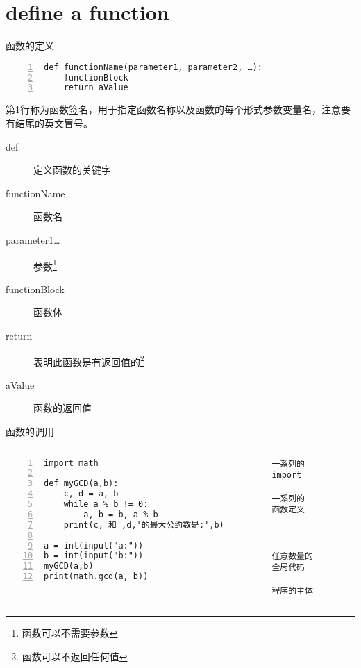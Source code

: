 \documentclass{beamer}
\begin{document}
\section{define a function}
\begin{frame}[fragile]{函数的定义}
\begin{Verbatim}[numbers=left,frame=single,rulecolor=\color{red}]
def functionName(parameter1, parameter2, …):
    functionBlock
    return aValue
\end{Verbatim}
第1行称为函数签名，用于指定函数名称以及函数的每个形式参数变量名，注意要有结尾的英文冒号。
\begin{description}
\item[ def ] 定义函数的关键字
\item[ functionName ] 函数名
\item[ parameter1…] 参数\footnote{函数可以不需要参数}
\item[ functionBlock ] 函数体
\item[ return ] 表明此函数是有返回值的\footnote{函数可以不返回任何值}
\item[ aValue ] 函数的返回值
\end{description}

\end{frame}

\begin{frame}[fragile]{函数的调用}
\begin{columns}
\begin{Verbatim}[numbers=left,frame=single,rulecolor=\color{red}]
import math

def myGCD(a,b):
    c, d = a, b
    while a % b != 0:
        a, b = b, a % b
    print(c,'和',d,'的最大公约数是:',b)

a = int(input("a:"))
b = int(input("b:"))
myGCD(a,b)
print(math.gcd(a, b))
\end{Verbatim}
\begin{Verbatim}[numbers=none,frame=single,rulecolor=\color{blue}]
一系列的
import

一系列的
函数定义



任意数量的
全局代码

程序的主体
\end{Verbatim}

\end{columns}
\end{frame}
\end{document}

